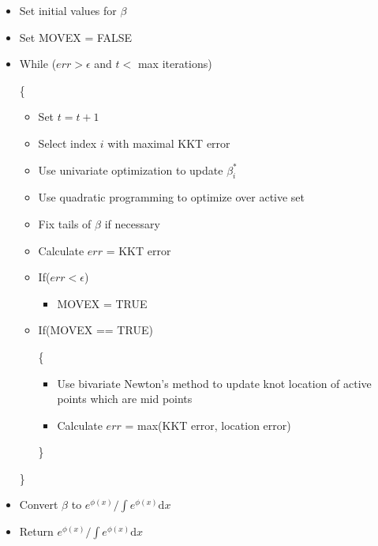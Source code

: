 \documentclass[10pt]{article}
\begin{document}
	\vspace{3mm}
	
	\begin{itemize}
	
		\item Set initial values for $\beta$ 
		
		\item Set MOVEX = FALSE
		
		\item While ($err > \epsilon$ and $t <$ max iterations)
		
		\{
		
			\begin{itemize}
			
			\item Set $t = t + 1$
			
			\item Select index $i$ with maximal KKT error
			
			\item Use univariate optimization to update $\beta_i^*$
						
			\item Use quadratic programming to optimize over active set
			
			\item Fix tails of $\beta$ if necessary
			
			\item Calculate $err$ = KKT error
			
			\item If($err < \epsilon$)
				
				\begin{itemize}
				
				\item MOVEX = TRUE
				
				\end{itemize}
			
			\item If(MOVEX == TRUE)
				
				\{
				
				\begin{itemize}
										
				\item Use bivariate Newton's method to update knot location of active points which are mid points
				
				\item Calculate $err$ = max(KKT error, location error)
				
				\end{itemize}
			
				\}
			
			\end{itemize}
			
	\}
	
	\item Convert $\beta$ to $e^{\phi(x)} / \int e ^ {\phi(x)} \mathrm{d}x$
	
	\item Return $e^{\phi(x)} / \int e ^ {\phi(x)}\mathrm{d}x$
	
	\end{itemize}
	
\end{document}
